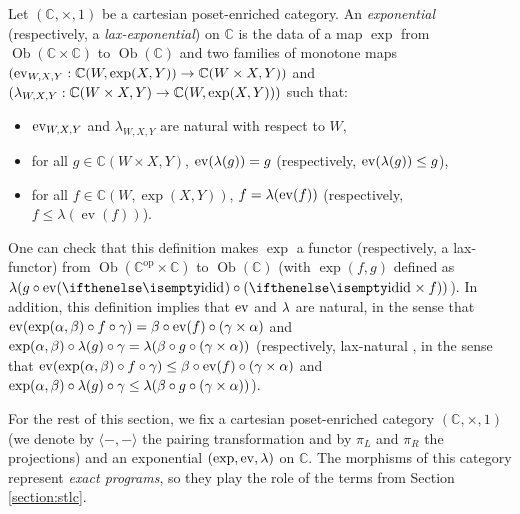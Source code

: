 \begin{definition} Let $(\mathbb{C}, \times, 1)$ be a cartesian poset-enriched category. An \emph{exponential} (respectively, a \emph{lax-exponential}) on $\mathbb{C}$ is the data of a map $\exp$ from $\operatorname{Ob}(\mathbb{C} \times \mathbb{C})$ to $\operatorname{Ob}(\mathbb{C})$ and two families of monotone maps $(\operatorname{ev}_{W,X,Y} : \mathbb{C}(W, \operatorname{exp}(X,Y)) \to \mathbb{C}(W \times X, Y))$ and $(\lambda_{W,X,Y} : \mathbb{C}(W \times X, Y) \to \mathbb{C}(W, \exp(X,Y)))$ such that: \begin{itemize}
\item $\operatorname{ev}_{W,X,Y}$ and $\lambda_{W,X,Y}$ are natural with respect to $W$,
\item for all $g \in \mathbb{C}(W \times X, Y)$, $\operatorname{ev}(\lambda(g)) = g$ (respectively, $\operatorname{ev}(\lambda(g)) \leq g$),
\item for all $f \in \mathbb{C}(W, \exp(X,Y))$, $f = \lambda(\operatorname{ev}(f))$ (respectively, $f \leq \lambda(\operatorname{ev}(f))$).
\end{itemize}
\end{definition}

One can check that this definition makes $\exp$ a functor (respectively, a lax-functor) from $\operatorname{Ob}(\mathbb{C}^{\operatorname{op}} \times \mathbb{C})$ to $\operatorname{Ob}(\mathbb{C})$ (with
$\exp(f,g)$ defined as $\lam(g\circ\ev(\id)\circ(\id\times f))$). In addition, this definition implies that $\operatorname{ev}$ and $\lambda$ are natural, in the sense that $\operatorname{ev}(\exp(\alpha,\beta)\circ f\circ\gamma) = \beta\circ\operatorname{ev}(f)\circ(\gamma\times\alpha)$ and $\exp(\alpha,\beta)\circ\lambda(g)\circ\gamma = \lambda(\beta\circ g\circ(\gamma\times\alpha))$ (respectively, lax-natural \cite{hilken:2-lambda}, in the sense that $\operatorname{ev}(\exp(\alpha,\beta)\circ f\circ\gamma) \leq \beta\circ\operatorname{ev}(f)\circ(\gamma\times\alpha)$ and $\exp(\alpha,\beta)\circ\lambda(g)\circ\gamma \leq \lambda(\beta\circ g\circ(\gamma\times\alpha))$).

For the rest of this section, we fix a cartesian poset-enriched category $(\mathbb{C}, \times, 1)$ (we denote by $\langle-,-\rangle$ the pairing transformation and by $\pi_L$ and $\pi_R$ the projections) and an exponential $(\exp, \operatorname{ev}, \lambda)$ on $\mathbb{C}$. The morphisms of this category represent \emph{exact programs}, so they play the role of the terms from Section \ref{section:stlc}.

